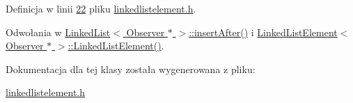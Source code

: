 Definicja w linii \hyperlink{linkedlistelement_8h_source_l00022}{22} pliku \hyperlink{linkedlistelement_8h_source}{linkedlistelement.\-h}.



Odwołania w \hyperlink{linkedlist_8h_source_l00238}{Linked\-List$<$ Observer $\ast$ $>$\-::insert\-After()} i \hyperlink{linkedlistelement_8h_source_l00027}{Linked\-List\-Element$<$ Observer $\ast$ $>$\-::\-Linked\-List\-Element()}.



Dokumentacja dla tej klasy została wygenerowana z pliku\-:\begin{DoxyCompactItemize}
\item 
\hyperlink{linkedlistelement_8h}{linkedlistelement.\-h}\end{DoxyCompactItemize}
